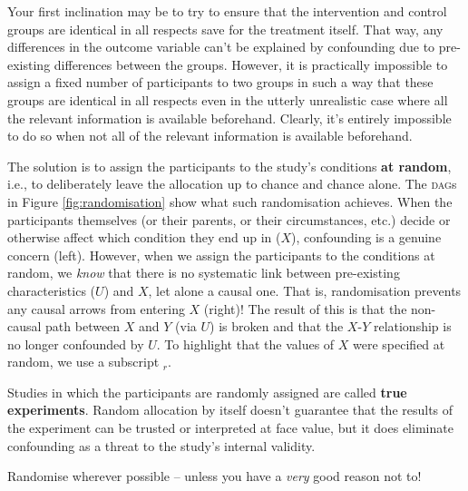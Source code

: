 \documentclass[a4paper]{tufte-book}\usepackage[]{graphicx}\usepackage[]{xcolor}
\newcommand{\term}[1]{\textbf{#1}}
\begin{document}
Your first inclination may be to try to ensure that the intervention and
control groups are identical in all respects save for the treatment itself.
That way, any differences in the outcome variable can't be explained by
confounding due to pre-existing differences between the groups.
However, it is practically
impossible to assign a fixed number of participants to two groups in such a
way that these groups are identical in all respects even in the utterly
unrealistic case where all the relevant information is available beforehand.
Clearly, it's entirely impossible to do so when not all of the relevant information
is available beforehand.

The solution is to assign the participants 
to the study's conditions \term{at random}, i.e., to deliberately leave the allocation
up to chance and chance alone. The \textsc{dag}s in Figure \vref{fig:randomisation} show what such
randomisation achieves. When the participants themselves (or their parents,
or their circumstances, etc.) decide or otherwise affect which condition they end up in ($X$),
confounding is a genuine concern (left).
However, when we assign the participants to the conditions at random,
we \emph{know} that there is no systematic link between pre-existing characteristics
($U$) and $X$, let alone a causal one. That is, randomisation prevents any
causal arrows from entering $X$ (right)! The result of this is that the
non-causal path between $X$ and $Y$ (via $U$) is broken and that the $X$-$Y$
relationship is no longer confounded by $U$.
To highlight that the values of $X$ were specified at random,
we use a subscript $_r$.

Studies in which the participants
are randomly assigned are called \term{true experiments}.
Random allocation by itself doesn't guarantee that the results of the
experiment can be trusted or interpreted at face value, but it does eliminate
confounding as a threat to the study's internal validity.

\begin{framed}
 Randomise wherever possible -- unless you have a \emph{very} good reason not to!
\end{framed}
\end{document}
